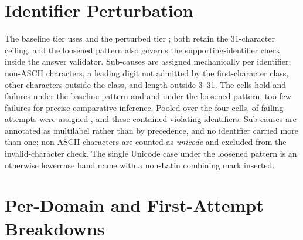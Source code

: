 \section{Identifier Perturbation}
\label{app:perturbation}

\begin{table}[ht]
\centering\small
\caption{Sub-causes of violating identifiers in 
failures, gpt-5.6-sol and gpt-5.6-terra, HotpotQA. Counts are
identifiers, not attempts.}
\label{tab:perturbation}
\end{table}

The baseline tier uses \idpattern{} and the perturbed tier \idpatternloose{};
both retain the 31-character ceiling, and the loosened pattern also
governs the supporting-identifier check inside the answer validator.
Sub-causes are assigned mechanically per identifier: non-ASCII characters,
a leading digit not admitted by the first-character class, other
characters outside the class, and length outside 3--31. The cells hold
 and
 failures under the baseline
pattern and  and
 under the loosened
pattern, too few failures for precise comparative inference. Pooled over
the four cells,  of
 failing attempts were assigned
, and these contained 
violating identifiers. Sub-causes are annotated as multilabel rather than
by precedence, and no identifier carried more than one; non-ASCII
characters are counted as \emph{unicode} and excluded from the
invalid-character check. The single Unicode case under the loosened
pattern is an otherwise lowercase band name with a non-Latin combining
mark inserted.

\section{Per-Domain and First-Attempt Breakdowns}
\label{app:breakdowns}

\begin{table}[htbp]
\centering\scriptsize
\caption{Per-cell results, reporting basis.}
\label{tab:domains}
\end{table}

\begin{table}[htbp]
\centering\scriptsize
\caption{Run completion and offline residual invalidity, reporting basis.
\emph{Att./compl.} is the total number of attempts in the cell,
including those of incomplete runs, divided by the number of completed
runs: the attempt cost per completed run, not the mean number of attempts
a completed run used. \emph{Residual} counts
pure-formatting  failures as recovered; it is computed
on stored attempts and is not the outcome of rerunning the pipeline with
fence removal enabled.}
\label{tab:operational}
\resizebox{\linewidth}{!}{}
\end{table}

